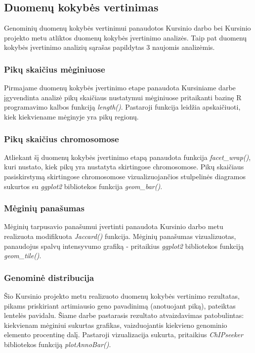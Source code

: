 \documentclass[12pt]{article}
\begin{document}
\subsection{Duomenų kokybės vertinimas}
Genominių duomenų kokybės vertinimui panaudotos Kursinio darbo bei Kursinio
projekto metu atliktos duomenų kokybės įvertinimo analizės. Taip pat
duomenų kokybės įvertinimo analizių sąrašas papildytas 3 naujomis analizėmis.

\subsubsection*{Pikų skaičius mėginiuose}
Pirmajame duomenų kokybės įvertinimo etape panaudota Kursiniame darbe
įgyvendinta analizė pikų skaičiaus nustatymui mėginiuose pritaikanti bazinę R
programavimo kalbos funkciją \emph{length()}. Pastaroji funkcija leidžia
apskaičiuoti, kiek kiekviename mėginyje yra pikų regionų.

\subsubsection*{Pikų skaičius chromosomose}
Atliekant šį duomenų kokybės įvertinimo etapą panaudota funkcija
\emph{facet\_wrap()}, kuri nustato, kiek pikų yra nustatyta skirtingose
chromosomose. Pikų skaičiaus pasiskirstymą skirtingose chromosomose
vizualizuojančios stulpelinės diagramos sukurtos su \emph{ggplot2}\cite{GGPLOT2}
bibliotekos funkcija \emph{geom\_bar()}.

\subsubsection*{Mėginių panašumas}
Mėginių tarpusavio panašumui įvertinti panaudota Kursinio darbo metu
realizuota modifikuota \emph{Jaccard()} funkcija. Mėginių panašumas
vizualizuotas, panaudojus spalvų intensyvumo grafiką - pritaikius
\emph{ggplot2} bibliotekos funkciją \emph{geom\_tile()}.

\subsubsection*{Genominė distribucija}
Šio Kursinio projekto metu realizuoto duomenų kokybės vertinimo rezultatas,
pikams priskiriant artimiausio geno pavadinimą (anotuojant piką), pateiktas
lentelės pavidalu. Šiame darbe pastarasis rezultato atvaizdavimas patobulintas:
kiekvienam mėginiui sukurtas grafikas, vaizduojantis kiekvieno genominio
elemento procentinę dalį. Pastaroji vizualizacija sukurta, pritaikius
\emph{ChIPseeker}\cite{CHIPSEEKER} bibliotekos funkciją \emph{plotAnnoBar()}.
\end{document}
